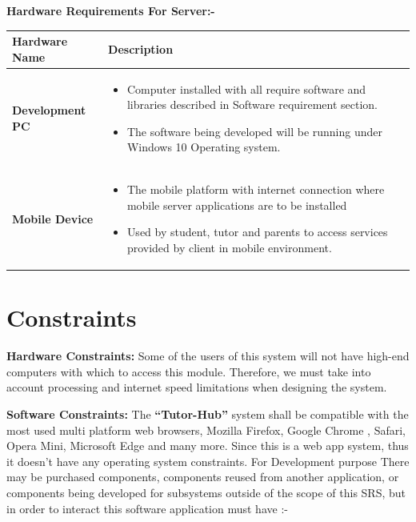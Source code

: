 \textbf{Hardware Requirements For Server:-}
\begin{center}
\setlength{\tabcolsep}{0.8cm}
\renewcommand{\arraystretch}{1.2}
        \centering
        \begin{longtable}{|m{90pt}|p{9cm}|}
            \hline
                \textbf{Hardware Name} & \textbf{Description}\\
            \hline
                \textbf{Development PC} &
                    \begin{itemize}
                        \item  Computer installed with all require software and libraries described in Software requirement section.
                        \item  The software being developed will be running under Windows 10 Operating system.
                    \end{itemize} \\
            \hline
                \textbf{Mobile Device} &
                    \begin{itemize}
                        \item  The mobile platform with internet connection where mobile server applications are to be installed
                        \item  Used by student, tutor and parents to access services provided by client in mobile environment.
                    \end{itemize} \\
            \hline
        \end{longtable}
\end{center}

\section{Constraints}
\textbf{Hardware Constraints:} Some of the users of this system will not have high-end computers with which to access this module. Therefore, we must take into account processing and internet speed limitations when designing the system. 

\textbf{Software Constraints:} The \textbf{“Tutor-Hub”} system shall be compatible with the most used multi platform web browsers, Mozilla Firefox, Google Chrome , Safari, Opera Mini, Microsoft Edge  and many more. Since this is a web app system, thus it doesn't have any operating system constraints. For Development purpose There may be purchased components, components reused from another application, or components being developed for subsystems outside of the scope of this SRS, but in order to interact this software application must have :-

